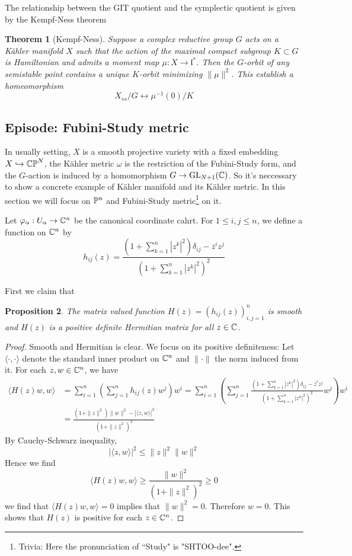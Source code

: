 \documentclass[11pt]{amsart}
\numberwithin{equation}{section}
\theoremstyle{plain}
\theoremstyle{plain}
\newtheorem{thmsub}{Theorem}[subsection]
\newtheorem{propsub}[thmsub]{Proposition}
\numberwithin{equation}{section}
\begin{document}
The relationship between the GIT quotient and the symplectic quotient is given by the Kempf-Ness theorem
\begin{thmsub}[Kempf-Ness]
Suppose a complex reductive group $G$ acts on a Kähler manifold $X$ such that the action of the maximal compact subgroup $K\subset G$ is Hamiltonian and admits a moment map $\mu:X\to\mathfrak{l}^*$. Then the $G$-orbit of any semistable point contains a unique $K$-orbit minimizing $\|\mu\|^2$. This establish a homeomorphism
$$
X_{ss}/G\longleftrightarrow \mu^{-1}(0)/K
$$
\end{thmsub}

\subsection{Episode: Fubini-Study metric}
In usually setting, $X$ is a smooth projective variety with a fixed embedding $X\hookrightarrow\Bbb{CP}^N$, the Kähler metric $\omega$ is the restriction of the Fubini-Study form, and the $G$-action is induced by a homomorphism $G\to\operatorname{GL}_{N+1}(\Bbb{C})$. So it's neccessary to show a concrete example of Kähler manifold and its Kähler metric. In this section we will focus on $\Bbb{P}^n$ and Fubini-Study metric\footnote{Trivia: Here the pronunciation of “Study" is "SHTOO-dee".} on it.

Let $\varphi_{\alpha}:U_{\alpha}\to\Bbb{C}^n$ be the canonical coordinate cahrt. For $1\leq i,j\leq n$, we define a function on $\Bbb{C}^n$ by
$$
h_{i j}(z)=\frac{(1+\sum_{k=1}^{n}|z^{k}|^{2}) \delta_{ij}-\overline{z}^{i} z^{j}}{(1+\sum_{k=1}^{n}|z^{k}|^{2})^{2}}
$$

First we claim that
\begin{propsub}
The matrix valued function $H(z)=(h_{ij}(z))_{i,j=1}^n$ is smooth and $H(z)$ is a positive definite Hermitian matrix for all $z\in\Bbb{C}$.
\end{propsub}
\begin{proof}
Smooth and Hermitian is clear. We focus on its positive definiteness: Let $\langle\cdot,\cdot\rangle$ denote the standard inner product on $\Bbb{C}^n$ and $\|\cdot\|$ the norm induced from it. For each $z,w\in\Bbb{C}^n$, we have
$$
\begin{aligned}
\langle H(z)w,w\rangle&=\sum_{i=1}^n(\sum_{j=1}^nh_{ij}(z)w^j)w^i=\sum_{i=1}^n(\sum_{j=1}^n\frac{(1+\sum_{k=1}^{n}|z^{k}|^{2}) \delta_{ij}-\overline{z}^{i} z^{j}}{(1+\sum_{k=1}^{n}|z^{k}|^{2})^{2}}w^j)w^i\\
&=\frac{(1+\|z\|^2)\|w\|^2-|\langle z,w\rangle|^2}{(1+\|z\|^2)^2}
\end{aligned}
$$
By Cauchy-Schwarz inequality,
$$
|\langle z,w\rangle|^2\leq\|z\|^2\|w\|^2
$$
Hence we find
$$
\langle H(z)w,w\rangle\ge\frac{\|w\|^2}{(1+\|z\|^2)^2}\ge0
$$
we find that $\langle H(z)w,w\rangle=0$ implies that $\|w\|^2=0$. Therefore $w=0$. This shows that $H(z)$ is positive for each $z\in\Bbb{C}^n$.
\end{proof}
\end{document}
